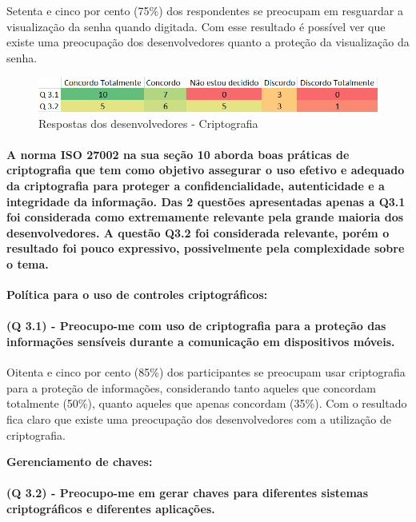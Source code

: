 Setenta e cinco por cento (75{\%}) dos respondentes se preocupam em resguardar a visualização da senha quando digitada.  Com esse resultado é possível  ver que existe uma preocupação dos desenvolvedores quanto a proteção da visualização da senha.





\begin{figure}[H]
\centering
\includegraphics[scale=0.7]{fig/Mapa de calor 2.PNG}
\caption{Respostas dos desenvolvedores - Criptografia}
\label{fig:2}
\end{figure}

\paragraph{A norma ISO 27002 na sua seção 10 aborda boas práticas de criptografia que tem como objetivo assegurar o uso efetivo e adequado da criptografia para proteger a confidencialidade, autenticidade e a integridade da informação.  Das 2 questões apresentadas apenas a Q3.1 foi considerada como extremamente relevante pela grande maioria dos desenvolvedores. A questão Q3.2 foi considerada relevante, porém o resultado foi pouco expressivo, possivelmente pela complexidade sobre o tema.}

\noindent\textbf{Política para o uso de controles criptográficos:}
\paragraph{\textbf{(Q 3.1)} - Preocupo-me com uso de criptografia para a proteção das informações sensíveis durante a comunicação em dispositivos móveis.}

Oitenta e cinco por cento (85{\%}) dos participantes se preocupam usar criptografia para a proteção de informações, considerando tanto aqueles que concordam totalmente (50{\%}), quanto aqueles que apenas concordam (35{\%}). Com o resultado fica claro que existe uma preocupação dos desenvolvedores com a utilização de criptografia.

\vspace{0.5cm}

\noindent\textbf{Gerenciamento de chaves:}
\paragraph{\textbf{(Q 3.2)} - Preocupo-me em gerar chaves para diferentes sistemas criptográficos e diferentes aplicações.}

